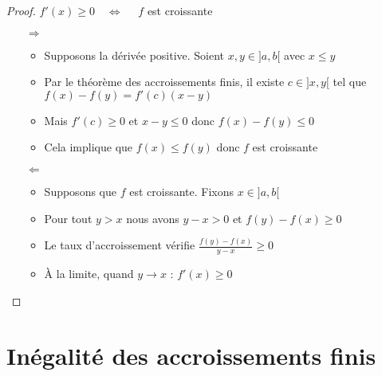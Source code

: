 \begin{frame}
\begin{proof}
\centerline{$f'(x) \ge 0 \quad \iff \quad$ $f$ est croissante}

\pause

\begin{itemize}
  \item[$\Longrightarrow$]
  \begin{itemize}
     \item Supposons la dérivée positive. Soient $x,y \in ]a,b[$ avec $x\le y$
\pause
     \item Par le théorème des accroissements finis, il existe $c\in]x,y[$ tel que
$f(x)-f(y) = f'(c) (x-y)$
\pause
     \item Mais $f'(c) \ge 0$ et $x-y \le 0$ donc $f(x)-f(y) \le 0$
\pause
     \item Cela implique que $f(x) \le f(y)$ donc $f$ est croissante
  \end{itemize}
\pause
  \item[$\Longleftarrow$]
  \begin{itemize}
     \item Supposons que $f$ est croissante. Fixons $x\in]a,b[$
\pause
     \item Pour tout $y > x$ nous avons $y-x>0$ et $f(y)-f(x)\ge 0$
\pause
     \item Le taux d'accroissement vérifie $\frac{f(y)-f(x)}{y-x}\ge 0$
\pause
     \item \`A la limite, quand $y \to x$ : $f'(x) \ge 0$
  \end{itemize}
\end{itemize}
\end{proof}
\end{frame}








\section*{Inégalité des accroissements finis}


